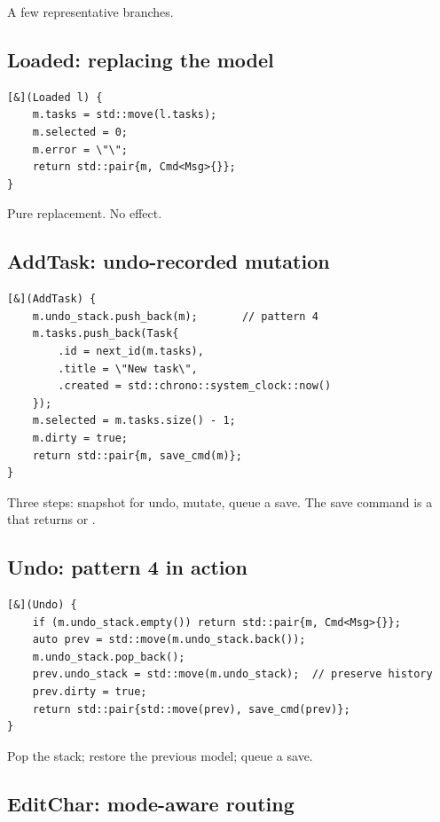 A few representative branches.

\subsection*{Loaded: replacing the model}

\begin{lstlisting}
[&](Loaded l) {
    m.tasks = std::move(l.tasks);
    m.selected = 0;
    m.error = \"\";
    return std::pair{m, Cmd<Msg>{}};
}
\end{lstlisting}

Pure replacement. No effect.

\subsection*{AddTask: undo-recorded mutation}

\begin{lstlisting}
[&](AddTask) {
    m.undo_stack.push_back(m);       // pattern 4
    m.tasks.push_back(Task{
        .id = next_id(m.tasks),
        .title = \"New task\",
        .created = std::chrono::system_clock::now()
    });
    m.selected = m.tasks.size() - 1;
    m.dirty = true;
    return std::pair{m, save_cmd(m)};
}
\end{lstlisting}

Three steps: snapshot for undo, mutate, queue a save. The save
command is a  that returns  or
.

\subsection*{Undo: pattern 4 in action}

\begin{lstlisting}
[&](Undo) {
    if (m.undo_stack.empty()) return std::pair{m, Cmd<Msg>{}};
    auto prev = std::move(m.undo_stack.back());
    m.undo_stack.pop_back();
    prev.undo_stack = std::move(m.undo_stack);  // preserve history
    prev.dirty = true;
    return std::pair{std::move(prev), save_cmd(prev)};
}
\end{lstlisting}

Pop the stack; restore the previous model; queue a save.

\subsection*{EditChar: mode-aware routing}

